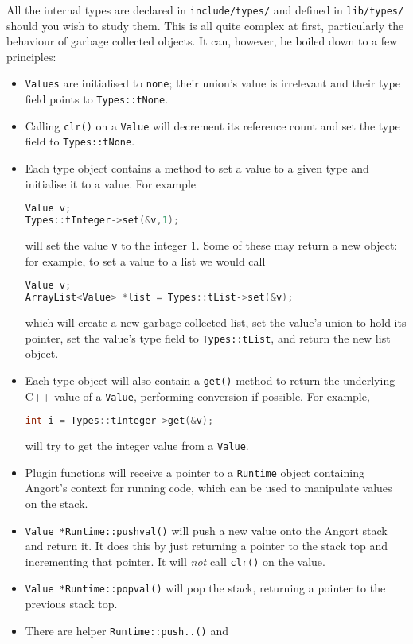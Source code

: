 All the internal types are declared in \texttt{include/types/} and
defined in \texttt{lib/types/} should you wish to study them.
This is all quite complex at first, particularly the behaviour of
garbage collected objects. It can, however, be boiled down to a few
principles:
\begin{itemize}
\item \texttt{Values} are initialised to \texttt{none}; their union's
value is irrelevant and their type field points to \texttt{Types::tNone}.
\item Calling \texttt{clr()} on a \texttt{Value} will decrement its
reference count and set the type field to \texttt{Types::tNone}.
\item Each type object contains a method to set a value to a given
type and initialise it to a value. For example
\begin{lstlisting}[language=c++]
Value v;
Types::tInteger->set(&v,1);
\end{lstlisting}
will set the value \texttt{v} to the integer 1.
Some of these may return a new object: for example, to set a value
to a list we would call
\begin{lstlisting}[language=c++]
Value v;
ArrayList<Value> *list = Types::tList->set(&v);
\end{lstlisting}
which will create a new garbage collected list, set the value's union
to hold its pointer, set the value's type field to 
\texttt{Types::tList}, and return the new list object.
\item Each type object will also contain a \texttt{get()} method
to return the underlying C++ value of a \texttt{Value}, performing
conversion if possible. For example,
\begin{lstlisting}[language=c++]
int i = Types::tInteger->get(&v);
\end{lstlisting}
will try to get the integer value from a \texttt{Value}.
\item Plugin functions will receive a pointer to a \texttt{Runtime} object
containing Angort's context for running code, which can be used to manipulate
values on the stack.
\item \texttt{Value *Runtime::pushval()} will push a new value onto the Angort
stack and return it. It does this by just returning a pointer to
the stack top and incrementing that pointer.  It will \emph{not} call \texttt{clr()} on the value.
\item \texttt{Value *Runtime::popval()} will pop the stack, returning a pointer
to the previous stack top.
\item There are helper \texttt{Runtime::push..()} and

\end{itemize}
